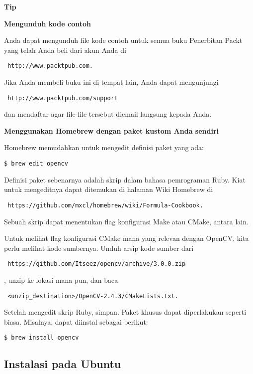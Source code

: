 \begin{enumerate}
\begin{enumerate}

\newpage
\textbf{Tip}

\textbf{Mengunduh kode contoh}

Anda dapat mengunduh file kode contoh untuk semua buku Penerbitan Packt yang telah Anda beli dari akun Anda di \begin{verbatim} http://www.packtpub.com.\end{verbatim} Jika Anda membeli buku ini di tempat lain, Anda dapat mengunjungi \begin{verbatim} http://www.packtpub.com/support\end{verbatim} dan mendaftar agar file-file tersebut diemail langsung kepada Anda.

\textbf{Menggunakan Homebrew dengan paket kustom Anda sendiri}

Homebrew memudahkan untuk mengedit definisi paket yang ada:
\begin{verbatim} 
$ brew edit opencv
\end{verbatim}

Definisi paket sebenarnya adalah skrip dalam bahasa pemrograman Ruby. Kiat untuk mengeditnya dapat ditemukan di halaman Wiki Homebrew di \begin{verbatim} https://github.com/mxcl/homebrew/wiki/Formula-Cookbook. \end{verbatim} Sebuah skrip dapat menentukan flag konfigurasi Make atau CMake, antara lain.

Untuk melihat flag konfigurasi CMake mana yang relevan dengan OpenCV, kita perlu melihat kode sumbernya. Unduh arsip kode sumber dari \begin{verbatim} https://github.com/Itseez/opencv/archive/3.0.0.zip \end{verbatim}, unzip ke lokasi mana pun, dan baca \begin{verbatim} <unzip_destination>/OpenCV-2.4.3/CMakeLists.txt. \end{verbatim}
Setelah mengedit skrip Ruby, simpan.
Paket khusus dapat diperlakukan seperti biasa. Misalnya, dapat diinstal sebagai berikut:
\begin{verbatim} 
$ brew install opencv
\end{verbatim}


\newpage
\subsection {Instalasi pada Ubuntu}


\end{enumerate}
\end{enumerate}
